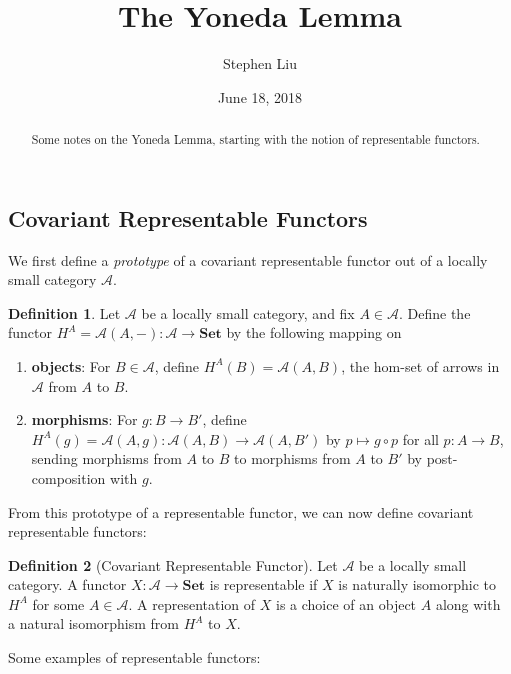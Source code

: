 \documentclass[11pt]{article}
\theoremstyle{definition}
\newtheorem*{defn}{Definition}
\theoremstyle{definition}
\theoremstyle{plain}
\theoremstyle{plain}
\theoremstyle{plain}
\begin{document}
\author{Stephen Liu}
\title{The Yoneda Lemma}
\date{June 18, 2018}

\maketitle

\begin{abstract}
Some notes on the Yoneda Lemma, starting with the notion of representable functors.
\end{abstract}

\subsection*{Covariant Representable Functors}

We first define a \emph{prototype} of a covariant representable functor out of a locally small category $\mathscr{A}$.

\begin{defn}
Let $\mathscr{A}$ be a locally small category, and fix $A \in \mathscr{A}$. Define the functor $H^{A}=\mathscr{A}(A, -): \mathscr{A} \to \textbf{Set}$ by the following mapping on

\begin{enumerate}
\item \textbf{objects}: For $B \in \mathscr{A}$, define $H^{A}(B) = \mathscr{A}(A,B)$, the hom-set of arrows in $\mathscr{A}$ from $A$ to $B$.
\item \textbf{morphisms}: For $g:B \to B'$, define $H^{A}(g) = \mathscr{A}(A, g): \mathscr{A}(A,B) \to \mathscr{A}(A,B')$ by $p \mapsto g \circ p$ for all $p : A \to B$, sending morphisms from $A$ to $B$ to morphisms from $A$ to $B'$ by post-composition with $g$.
\end{enumerate}
\end{defn}

From this prototype of a representable functor, we can now define covariant representable functors:

\begin{defn}[Covariant Representable Functor]
Let $\mathscr{A}$ be a locally small category. A functor $X:\mathscr{A} \to \textbf{Set}$ is representable if $X$ is naturally isomorphic to $H^{A}$ for some $A \in \mathscr{A}$. A representation of $X$ is a choice of an object $A$ along with a natural isomorphism from $H^{A}$ to $X$.
\end{defn}

Some examples of representable functors:
\end{document}
